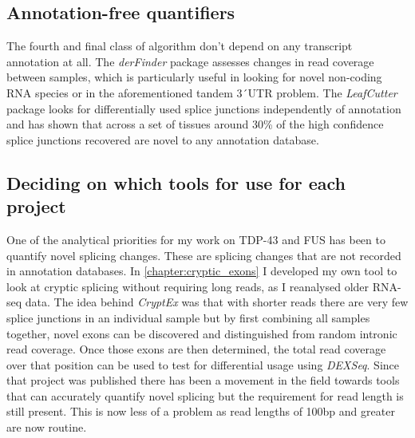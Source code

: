 \subsection{Annotation-free quantifiers}
The fourth and final class of algorithm don't depend on any transcript annotation at all. The \textit{derFinder} package \citep{Collado-Torres2017} assesses changes in read coverage between samples, which is particularly useful in looking for novel non-coding RNA species or in the aforementioned tandem 3\'\ UTR problem. The \textit{LeafCutter} package \citep{Li2018} looks for differentially used splice junctions independently of annotation and has shown that across a set of tissues around 30\% of the high confidence splice junctions recovered are novel to any annotation database. 


\subsection{Deciding on which tools for use for each project}

One of the analytical priorities for my work on TDP-43 and FUS has been to quantify novel splicing changes. These are splicing changes that are not recorded in annotation databases. In \autoref{chapter:cryptic_exons} I developed my own tool to look at cryptic splicing without requiring long reads, as I reanalysed older RNA-seq data. 
The idea behind \textit{CryptEx} was that with shorter reads there are very few splice junctions in an individual sample but by first combining all samples together, novel exons can be discovered and distinguished from random intronic read coverage. 
Once those exons are then determined, the total read coverage over that position can be used to test for differential usage using \textit{DEXSeq}. 
Since that project was published there has been a movement in the field towards tools that can accurately quantify novel splicing but the requirement for read length is still present.
This is now less of a problem as read lengths of 100bp and greater are now routine.

